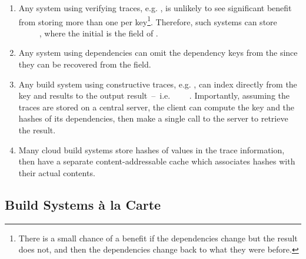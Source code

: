 \begin{enumerate}
\item Any system using verifying traces, e.g. \Shake, is unlikely to see
significant benefit from storing more than one  per key\footnote{There
is a small chance of a benefit if the dependencies change but the result does
not, and then the dependencies change back to what they were before.}.
Therefore, such systems can store ~~~~~,
where the initial  is the  field of .

\item Any system using  dependencies can omit the dependency
keys from the  since they can be recovered from the  field.

\item Any  build system using constructive traces, e.g.
\Bazel, can index directly from the key and results to the output result~--~i.e.
~~\hs{[Hash}~\hs{v])}~. Importantly, assuming the traces
are stored on a central server, the client can compute the key and the hashes of
its dependencies, then make a single call to the server to retrieve the result.

\item Many cloud build systems store hashes of values in the trace information,
then have a separate content-addressable cache which associates hashes with
their actual contents.
\end{enumerate}

\subsection{Build Systems \`a la Carte}\label{sec-design-space}


